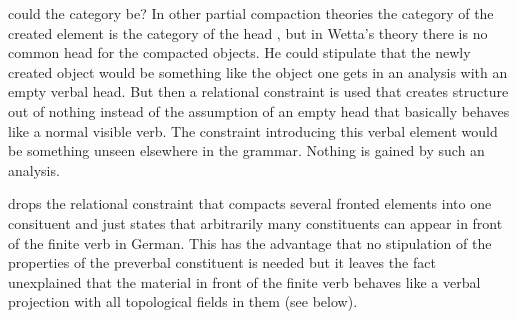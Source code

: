 \begin{exe}
\begin{xlist}
could the category be? In other partial compaction theories the category of the created element is
the category of the head \citep{KP95a,Kathol2001a,Babel,Mueller99a}, but in Wetta's theory there is no common head for the compacted
objects. He could stipulate that the newly created object would be something like the object one gets in an analysis with an empty
verbal head. But then a relational constraint is used that creates structure out of nothing
instead of the assumption of an empty head that basically behaves like a normal visible verb. The
constraint introducing this verbal element would be something unseen elsewhere in the grammar. Nothing is gained by such an analysis.

\citet{Wetta2014a-u} drops the relational constraint that compacts several fronted elements into one
consituent and just states that arbitrarily many constituents can appear in front of the finite verb
in German. This has the advantage that no stipulation of the properties of the preverbal constituent
is needed but it leaves the fact unexplained that the material in front of the finite verb behaves
like a verbal projection with all topological fields in them (see below). 


\end{xlist}
\end{exe}
